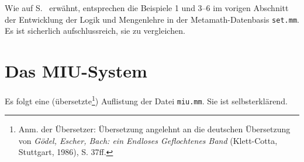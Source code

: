 Wie auf S.~\pageref{exampleref} erwähnt, entsprechen die Beispiele 1 und 3--6 im vorigen Abschnitt der Entwicklung der Logik und Mengenlehre in der Metamath-Datenbasis \texttt{set.mm}. Es ist sicherlich aufschlussreich, sie zu vergleichen.


\chapter{Das MIU-System}
\label{MIU}

Es folgt eine (übersetzte\footnote{Anm. der Übersetzer: Übersetzung angelehnt an die deutschen Übersetzung von \textit{Gödel, Escher, Bach: ein Endloses Geflochtenes Band} (Klett-Cotta, Stuttgart, 1986), S. 37ff.}) Auflistung der Datei \texttt{miu.mm}.  Sie ist selbsterklärend.


